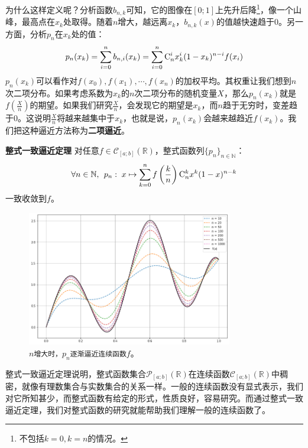 \documentclass[12pt,UTF8]{ctexbook}
\begin{document}
为什么这样定义呢？分析函数$b_{n,k}$可知，它的图像在$[0;1]$上先升后降\footnote{不包括$k=0,k=n$的情况。}，像一个山峰，最高点在$x_k$处取得。随着$n$增大，越远离$x_k$，$b_{n,k}(x)$的值越快速趋于$0$。另一方面，分析$p_n$在$x_k$处的值：
\begin{align*}
    p_n(x_k) = \sum_{i=0}^n b_{n,i}(x_k) = \sum_{i=0}^n \mathrm{C}_{n}^{i} x_k^i(1 - x_k)^{n-i} f(x_i) 
\end{align*}
$p_n(x_k)$可以看作对$f(x_0), f(x_1), \cdots, f(x_n)$的加权平均。其权重让我们想到$n$次二项分布。如果考虑系数为$x_k$的$n$次二项分布的随机变量$X$，那么$p_n(x_k)$就是$\displaystyle f\left(\frac{X}{n}\right)$的期望。如果我们研究$\frac{X}{n}$，会发现它的期望是$x_k$，而$n$趋于无穷时，变差趋于$0$。这说明$\frac{X}{n}$将越来越集中于$x_k$，也就是说，$p_n(x_k)$会越来越趋近$f(x_k)$。我们把这种逼近方法称为\textbf{二项逼近}。

\begin{tm}{\textbf{整式一致逼近定理}}
    对任意$f\in\mathcal{C}_{[a;b]}(\mathbb{R})$，整式函数列$\{p_n\}_{n\in\mathbb{N}}$：
    \begin{align*}
        \forall n\in\mathbb{N},\;\, p_n: \; x\mapsto \sum_{k=0}^n f\left(\frac{k}{n}\right) \mathrm{C}_{n}^{k} x^k(1 - x)^{n-k}
    \end{align*}
    一致收敛到$f$。
\end{tm}

\begin{figure}[h]
    \vspace{4pt}
    \centering
    \includegraphics[width=0.8\textwidth]{tu/整式一致逼近1.png}
    \captionsetup{justification=centering}
    \caption*{$n$\texttt{增大时，}$p_n$\texttt{逐渐逼近连续函数}$f$。}
\end{figure}

整式一致逼近定理说明，整式函数集合$\mathcal{P}_{[a;b]}(\mathbb{R})$在连续函数$\mathcal{C}_{[a;b]}(\mathbb{R})$中稠密，就像有理数集合与实数集合的关系一样。一般的连续函数没有显式表示，我们对它所知甚少，而整式函数有给定的形式，性质良好，容易研究。而通过整式一致逼近定理，我们对整式函数的研究就能帮助我们理解一般的连续函数了。
\end{document}
